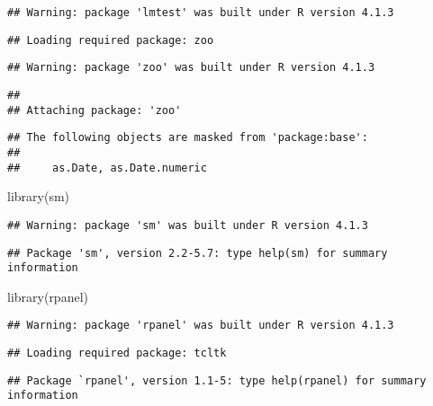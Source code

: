 \documentclass[
]{article}
\newenvironment{Shaded}{\begin{snugshade}}{\end{snugshade}}
\newcommand{\FunctionTok}[1]{\textcolor[rgb]{0.00,0.00,0.00}{#1}}
\newcommand{\NormalTok}[1]{#1}
\begin{document}
\begin{verbatim}
## Warning: package 'lmtest' was built under R version 4.1.3
\end{verbatim}

\begin{verbatim}
## Loading required package: zoo
\end{verbatim}

\begin{verbatim}
## Warning: package 'zoo' was built under R version 4.1.3
\end{verbatim}

\begin{verbatim}
## 
## Attaching package: 'zoo'
\end{verbatim}

\begin{verbatim}
## The following objects are masked from 'package:base':
## 
##     as.Date, as.Date.numeric
\end{verbatim}

\begin{Shaded}
\begin{Highlighting}[]
\FunctionTok{library}\NormalTok{(sm)}
\end{Highlighting}
\end{Shaded}

\begin{verbatim}
## Warning: package 'sm' was built under R version 4.1.3
\end{verbatim}

\begin{verbatim}
## Package 'sm', version 2.2-5.7: type help(sm) for summary information
\end{verbatim}

\begin{Shaded}
\begin{Highlighting}[]
\FunctionTok{library}\NormalTok{(rpanel)   }
\end{Highlighting}
\end{Shaded}

\begin{verbatim}
## Warning: package 'rpanel' was built under R version 4.1.3
\end{verbatim}

\begin{verbatim}
## Loading required package: tcltk
\end{verbatim}

\begin{verbatim}
## Package `rpanel', version 1.1-5: type help(rpanel) for summary information
\end{verbatim}
\end{document}
